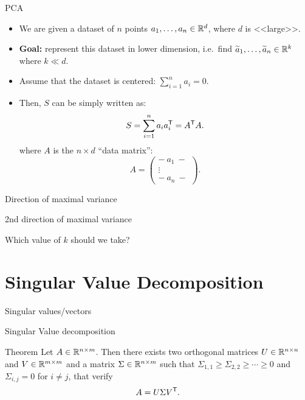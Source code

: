 \documentclass{beamer}
\begin{document}
\begin{frame}[t]{PCA}
	\grid

	\begin{itemize}
		\item We are given a dataset of $n$ points $a_1, \dots, a_n \in \mathbb{R}^d$, where $d$ is <<large>>.
			\vspace{0.1cm}
		\item \textbf{Goal:} represent this dataset in lower dimension, i.e.\ find $\widetilde{a}_1, \dots, \widetilde{a}_n \in \mathbb{R}^k$ where $k \ll d$.
			\vspace{0.1cm}
		\item Assume that the dataset is centered: $\sum_{i=1}^n a_i = 0$.
			\vspace{0.1cm}
		\item Then, $S$ can be simply written as:
			$$
			S = \sum_{i=1}^n a_i a_i^{{\sf T}}
			= A^{{\sf T}} A.
			$$
			where $A$ is the $n\times d$ ``data matrix'':
			$$
			A =
			\begin{pmatrix}
				- \ a_1 \ - \\
				\vdots  \\
				- \ a_n \ -
			\end{pmatrix}
			.
			$$
	\end{itemize}
\end{frame}

\begin{frame}[t]{Direction of maximal variance}
	\grid
	\pause

\end{frame}
\begin{frame}[t]{2nd direction of maximal variance}
	\grid

\end{frame}

\begin{frame}[t]{Which value of $k$ should we take?}
	\grid

\end{frame}


\section{Singular Value Decomposition}


\begin{frame}[t]{Singular values/vectors}
	\grid


\end{frame}
\begin{frame}[t]{Singular Value decomposition}
	\grid

	\begin{block}{Theorem}
		Let $A \in \mathbb{R}^{n \times m}$. Then there exists two orthogonal matrices $U \in \mathbb{R}^{n \times n}$ and $V \in \mathbb{R}^{m \times m}$ and a matrix $\Sigma \in \mathbb{R}^{n \times m}$ such that $\Sigma_{1,1} \geq \Sigma_{2,2}  \geq \cdots \geq 0$ and $\Sigma_{i,j} = 0$ for $i\neq j$, that verify
		$$
		A = U \Sigma V^{{\sf T}}.
		$$
	\end{block}

\end{frame}
\end{document}
